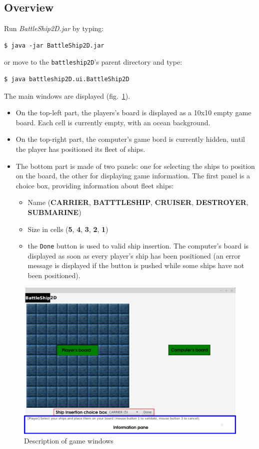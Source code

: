 \documentclass[twoside]{article}
\begin{document}
\subsection{Overview}

Run \textit{BattleShip2D.jar} by typing:
\begin{verbatim}
$ java -jar BattleShip2D.jar
\end{verbatim}

or move to the \texttt{battleship2D}'s parent directory and type:
\begin{verbatim}
$ java battleship2D.ui.BattleShip2D
\end{verbatim}


The main windows are displayed (fig.~\ref{fig:mainWindows01}). 
\begin{itemize}
\item On the top-left part, the players's board is displayed as a 10x10 empty game board. Each cell is currently empty, with an ocean background.
\item On the top-right part, the computer's game bord is currently hidden, until the player has positioned its fleet of ships. 
\item The bottom part is made of two panels: one for selecting the ships to position on the board, the other for displaying game information.
The first panel is a choice box, providing information about fleet ships:
\begin{itemize}
\item Name (\textbf{CARRIER}, \textbf{BATTTLESHIP}, \textbf{CRUISER}, \textbf{DESTROYER}, \textbf{SUBMARINE})
\item Size in cells (\textbf{5}, \textbf{4}, \textbf{3}, \textbf{2}, \textbf{1})
\item the \texttt{Done} button is used to valid ship insertion. The computer's board is displayed as soon as every player's ship has been positioned (an error message is displayed if the button is pushed while some ships have not been positioned).
\end{itemize}
\end{itemize}

\begin{figure}[h!]
\centering
\includegraphics[scale=0.45]{figures/mainWindowsDescription-01.pdf}
\caption{Description of game windows}
\label{fig:mainWindows01}
\end{figure}
\end{document}
